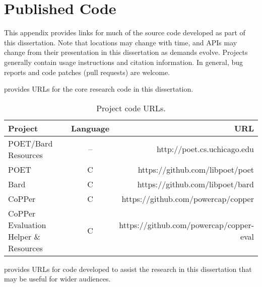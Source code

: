 \chapter{Published Code}
\label{app:urls}

This appendix provides links for much of the source code developed as part of this dissertation.
Note that locations may change with time, and APIs may change from their presentation in this dissertation as demands evolve.
Projects generally contain usage instructions and citation information.
In general, bug reports and code patches (\eg pull requests) are welcome.

 provides URLs for the core research code in this dissertation.

\begin{table}[ht]
\scriptsize
\centering
\caption{Project code URLs.}
\begin{tabular}{lcr}
  \textbf{Project} & \textbf{Language} & \textbf{URL} \\
  \hline
  \hline
  POET/Bard Resources & -- & http://poet.cs.uchicago.edu \\
  POET & C & https://github.com/libpoet/poet \\
  Bard & C & https://github.com/libpoet/bard \\
  \hline
  CoPPer & C & https://github.com/powercap/copper \\
  CoPPer Evaluation Helper \& Resources & C & https://github.com/powercap/copper-eval \\
  \hline
  \hline
\end{tabular}
\label{tbl:project-code}
\end{table}

 provides URLs for code developed to assist the research in this dissertation that may be useful for wider audiences.

